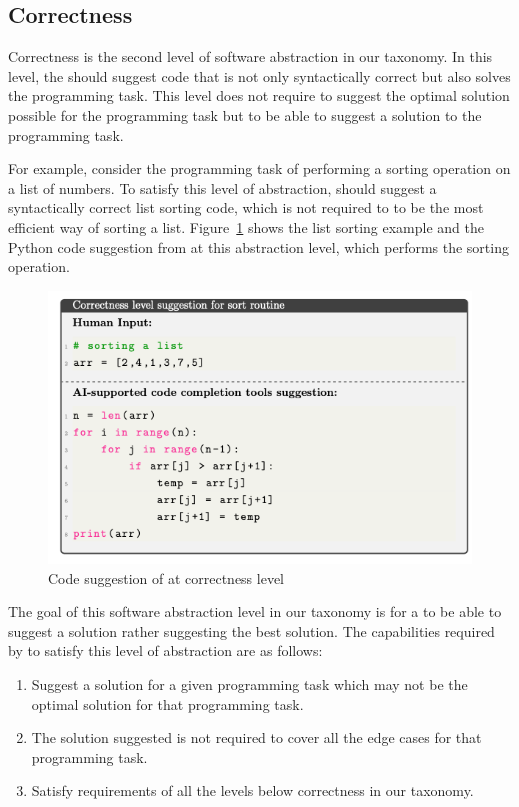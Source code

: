 \subsection{Correctness}
\label{correctness}
Correctness is the second level of software abstraction in our taxonomy. In this level, the \cct{} should suggest code that is not only syntactically correct but also solves the programming task. 
This level does not require \cct{} to suggest the optimal solution possible for the programming task but to be able to suggest a solution to the programming task.

For example, consider the programming task of performing a sorting operation on a list of numbers. To satisfy this level of abstraction, \cct{} should suggest a syntactically correct list sorting code, which is not required to to be the most efficient way of sorting a list.
Figure~\ref{fig:correctness} shows the list sorting example and the Python code suggestion from \cct{} at this abstraction level, which performs the sorting operation.

\begin{figure}[hbt!]
    \centering
    \includegraphics[width=.9\linewidth]{Figures/correctness.png}
    \caption{Code suggestion of \cct{} at correctness level}
    \label{fig:correctness}
\end{figure}

The goal of this software abstraction level in our taxonomy is for a \cct{} to be able to suggest a solution rather suggesting the best solution.
The capabilities required by \cct{} to satisfy this level of abstraction are as follows:

\begin{enumerate}
    \item Suggest a solution for a given programming task which may not be the optimal solution for that programming task.
    \item The solution suggested is not required to cover all the edge cases for that programming task.
    \item Satisfy requirements of all the levels below correctness in our taxonomy.
\end{enumerate}

